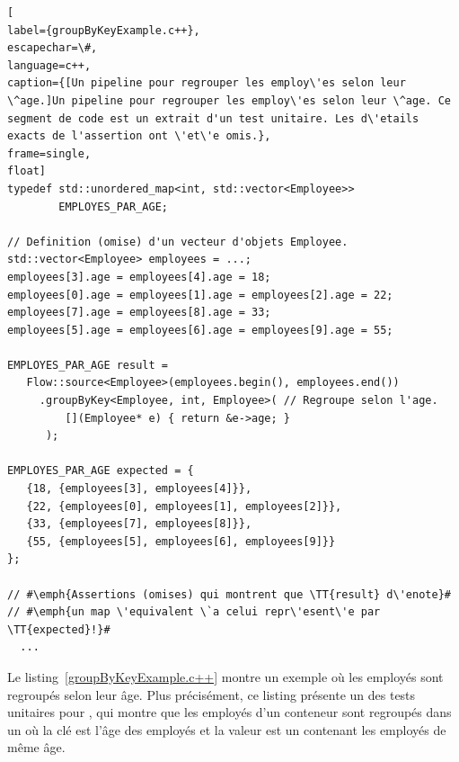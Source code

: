 \begin{lstlisting}[
label={groupByKeyExample.c++},
escapechar=\#,
language=c++,
caption={[Un pipeline pour regrouper les employ\'es selon leur \^age.]Un pipeline pour regrouper les employ\'es selon leur \^age. Ce segment de code est un extrait d'un test unitaire. Les d\'etails exacts de l'assertion ont \'et\'e omis.},
frame=single,
float]
typedef std::unordered_map<int, std::vector<Employee>> 
        EMPLOYES_PAR_AGE;

// Definition (omise) d'un vecteur d'objets Employee.
std::vector<Employee> employees = ...; 
employees[3].age = employees[4].age = 18;
employees[0].age = employees[1].age = employees[2].age = 22;
employees[7].age = employees[8].age = 33;
employees[5].age = employees[6].age = employees[9].age = 55;

EMPLOYES_PAR_AGE result = 
   Flow::source<Employee>(employees.begin(), employees.end())
     .groupByKey<Employee, int, Employee>( // Regroupe selon l'age.
         [](Employee* e) { return &e->age; } 
      );
    
EMPLOYES_PAR_AGE expected = {
   {18, {employees[3], employees[4]}},
   {22, {employees[0], employees[1], employees[2]}},
   {33, {employees[7], employees[8]}},
   {55, {employees[5], employees[6], employees[9]}}
};

// #\emph{Assertions (omises) qui montrent que \TT{result} d\'enote}#
// #\emph{un map \'equivalent \`a celui repr\'esent\'e par \TT{expected}!}#
  ...
\end{lstlisting}




Le listing~\ref{groupByKeyExample.c++} montre un exemple o\`u les employ\'es sont regroup\'es selon leur \^age. Plus pr\'ecis\'ement, ce listing pr\'esente un des tests unitaires pour , qui montre que les employ\'es d'un conteneur sont regroup\'es dans un  o\`u la cl\'e est l'\^age des employ\'es et la valeur est un  contenant les employ\'es de m\^eme \^age.
%

